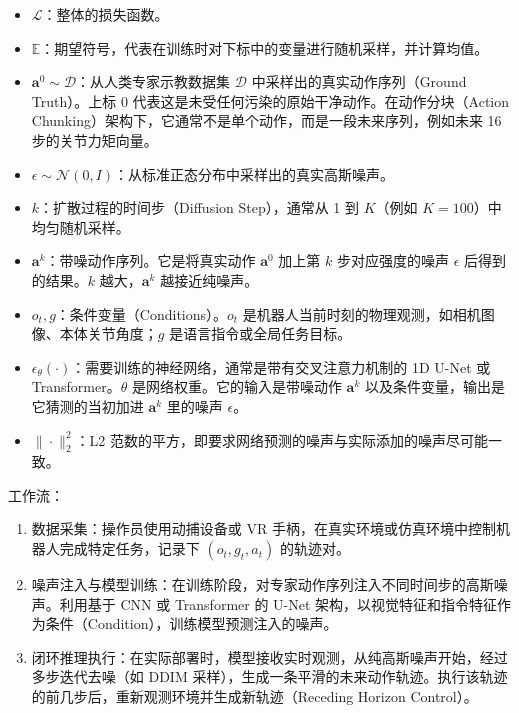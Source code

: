\begin{itemize}
\tightlist
\item
  \(\mathcal{L}\)：整体的损失函数。
\item
  \(\mathbb{E}\)：期望符号，代表在训练时对下标中的变量进行随机采样，并计算均值。
\item
  \(\mathbf{a}^0\sim\mathcal{D}\)：从人类专家示教数据集 \(\mathcal{D}\) 中采样出的真实动作序列（Ground Truth）。上标 0 代表这是未受任何污染的原始干净动作。在动作分块（Action Chunking）架构下，它通常不是单个动作，而是一段未来序列，例如未来 16 步的关节力矩向量。
\item
  \(\epsilon\sim\mathcal{N}(0,I)\)：从标准正态分布中采样出的真实高斯噪声。
\item
  \(k\)：扩散过程的时间步（Diffusion Step），通常从 1 到 \(K\)（例如 \(K=100\)）中均匀随机采样。
\item
  \(\mathbf{a}^k\)：带噪动作序列。它是将真实动作 \(\mathbf{a}^0\) 加上第 \(k\) 步对应强度的噪声 \(\epsilon\) 后得到的结果。\(k\) 越大，\(\mathbf{a}^k\) 越接近纯噪声。
\item
  \(o_t,g\)：条件变量（Conditions）。\(o_t\) 是机器人当前时刻的物理观测，如相机图像、本体关节角度；\(g\) 是语言指令或全局任务目标。
\item
  \(\epsilon_\theta(\cdot)\)：需要训练的神经网络，通常是带有交叉注意力机制的 1D U-Net 或 Transformer。\(\theta\) 是网络权重。它的输入是带噪动作 \(\mathbf{a}^k\) 以及条件变量，输出是它猜测的当初加进 \(\mathbf{a}^k\) 里的噪声 \(\epsilon\)。
\item
  \(\|\cdot\|_2^2\)：L2 范数的平方，即要求网络预测的噪声与实际添加的噪声尽可能一致。
\end{itemize}

工作流：

\begin{enumerate}
\def\labelenumi{\arabic{enumi}.}
\tightlist
\item
  数据采集：操作员使用动捕设备或 VR 手柄，在真实环境或仿真环境中控制机器人完成特定任务，记录下 \((o_t,g_t,a_t)\) 的轨迹对。
\item
  噪声注入与模型训练：在训练阶段，对专家动作序列注入不同时间步的高斯噪声。利用基于 CNN 或 Transformer 的 U-Net 架构，以视觉特征和指令特征作为条件（Condition），训练模型预测注入的噪声。
\item
  闭环推理执行：在实际部署时，模型接收实时观测，从纯高斯噪声开始，经过多步迭代去噪（如 DDIM 采样），生成一条平滑的未来动作轨迹。执行该轨迹的前几步后，重新观测环境并生成新轨迹（Receding Horizon Control）。
\end{enumerate}

